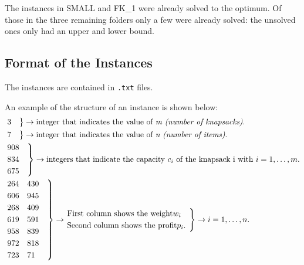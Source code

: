 The instances in SMALL and FK\_1 were already solved to the optimum.
Of those in the three remaining folders only a few were already solved:
the unsolved ones only had an upper and lower bound.

\subsection{Format of the Instances}
The instances are contained in \texttt{.txt} files.

An example of the structure of an instance is shown below:
\[
    \begin{split}
        &\begin{rcases*}
             3 \quad
        \end{rcases*}
        \rightarrow \text{integer that indicates the value of \textit{m (number of knapsacks)}.}\\
        &\begin{rcases*}
             7 \quad
        \end{rcases*}
        \rightarrow \text{integer that indicates the value of \textit{n (number of items)}.}\\
        &\begin{rcases*}
             908 \quad\\
             834\\
             675\\
        \end{rcases*}
        \rightarrow \text{integers that indicate the capacity } c_{i} \text{ of the knapsack i with }
        \space i=1,\dots,m.\\
        &\begin{rcases*}
             264    \quad 430 \quad\\
             606 \quad    945\\
             268 \quad    409\\
             619 \quad    591\\
             958 \quad    839\\
             972 \quad    818\\
             723 \quad    71\\
        \end{rcases*}
        \rightarrow
        \begin{rcases*}
            \text{First column shows the weight} w_{i} \quad \\
            \text{Second column shows the profit} p_{i}.
        \end{rcases*}
        \rightarrow
        \space i=1,\dots,n.
    \end{split}
\]

